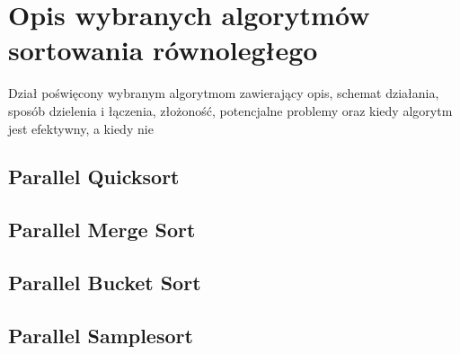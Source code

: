 \cleardoublepage
\chapter{Opis wybranych algorytmów sortowania równoległego}
\label{cha:WybraneAlgorytmy}

Dział poświęcony wybranym algorytmom zawierający opis, schemat działania, sposób dzielenia i łączenia, złożoność, potencjalne problemy oraz kiedy algorytm jest efektywny, a kiedy nie

\section{Parallel Quicksort}
\label{sec:ParallelQuicksort}



\section{Parallel Merge Sort}
\label{sec:ParallelMergeSort}



\section{Parallel Bucket Sort}
\label{sec:ParallelBucketSort}



\section{Parallel Samplesort}
\label{sec:ParallelSamplesort}

